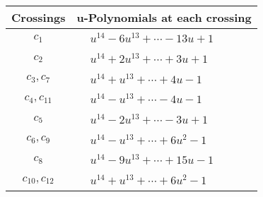 \documentclass[1p]{elsarticle_modified}
\theoremstyle{definition}
\begin{document}
\begin{tabular}{m{50pt}|m{274pt}}
Crossings & \hspace{64pt}u-Polynomials at each crossing \\
\hline $$\begin{aligned}c_{1}\end{aligned}$$&$\begin{aligned}
&u^{14}-6 u^{13}+\cdots-13 u+1
\end{aligned}$\\
\hline $$\begin{aligned}c_{2}\end{aligned}$$&$\begin{aligned}
&u^{14}+2 u^{13}+\cdots+3 u+1
\end{aligned}$\\
\hline $$\begin{aligned}c_{3},c_{7}\end{aligned}$$&$\begin{aligned}
&u^{14}+u^{13}+\cdots+4 u-1
\end{aligned}$\\
\hline $$\begin{aligned}c_{4},c_{11}\end{aligned}$$&$\begin{aligned}
&u^{14}- u^{13}+\cdots-4 u-1
\end{aligned}$\\
\hline $$\begin{aligned}c_{5}\end{aligned}$$&$\begin{aligned}
&u^{14}-2 u^{13}+\cdots-3 u+1
\end{aligned}$\\
\hline $$\begin{aligned}c_{6},c_{9}\end{aligned}$$&$\begin{aligned}
&u^{14}- u^{13}+\cdots+6 u^2-1
\end{aligned}$\\
\hline $$\begin{aligned}c_{8}\end{aligned}$$&$\begin{aligned}
&u^{14}-9 u^{13}+\cdots+15 u-1
\end{aligned}$\\
\hline $$\begin{aligned}c_{10},c_{12}\end{aligned}$$&$\begin{aligned}
&u^{14}+u^{13}+\cdots+6 u^2-1
\end{aligned}$\\
\hline
\end{tabular}\\~\\
\end{document}

